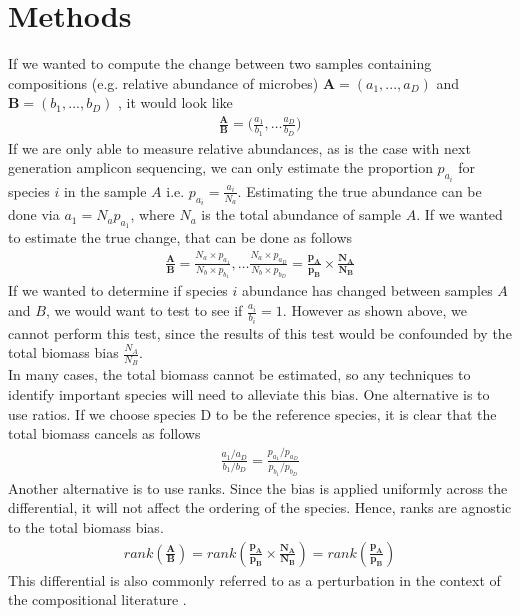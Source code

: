 \section{Methods}
If we wanted to compute the change between two samples containing compositions (e.g. relative abundance of microbes) $\bm A=(a_1,...,a_D)$ and $\bm B=(b_1,...,b_D)$ , it would look like
\begin{align}
  \frac{\bm{A}}{\bm{B}}=\big(\frac{a_1}{b_1} ,\ldots  \frac{a_D}{b_D}\big)
\end{align}
If we are only able to measure relative abundances, as is the case with next generation amplicon sequencing, we can only estimate the proportion $p_{a_i}$ for species $i$ in the sample $A$  i.e. $p_{a_i}=\frac{a_i}{N_a}$.  Estimating the true abundance can be done via $a_1=N_a p_{a_1}$, where $N_a$ is the total abundance of sample $A$.  If we wanted to estimate the true change, that can be done as follows
\begin{align}
  \frac{\bm{A}}{\bm{B}} =
  \frac{N_a \times p_{a_1}}{N_b \times p_{b_1}}, \ldots \frac{N_a \times p_{a_D}}{N_b \times p_{b_D}} =
  \frac{\bm{p_A}}{\bm{p_B}} \times  \frac{\bm{N_A}}{\bm{N_B}}
\end{align}
If we wanted to determine if species $i$ abundance has changed between samples $A$ and $B$, we would want to test to see if $\frac{a_i}{b_i}=1$. However as shown above, we cannot perform this test, since the results of this test would be confounded by the total biomass bias $\frac{N_A}{N_B}$.\\[5 mm]
In many cases, the total biomass cannot be estimated, so any techniques to identify important species will need to alleviate this bias. One alternative is to use ratios. If we choose species D to be the reference species, it is clear that the total biomass cancels as follows
\begin{align}
  \frac{a_1/a_D}{b_1/b_D}  =  \frac{p_{a_1}/p_{a_D} }{p_{b_1}/p_{b_D}}
\end{align}
Another alternative is to use ranks. Since the bias is applied uniformly across the differential, it will not affect the ordering of the species. Hence, ranks are agnostic to the total biomass bias.
\begin{align}
  rank (\frac{\bm{A}}{\bm{B}}) =
  rank(\frac{\bm{p_A}}{\bm{p_B}} \times \frac{\bm{N_A}}{\bm{N_B}}) =
  rank(\frac{\bm{p_A}}{\bm{p_B}} )
\end{align}
This differential is also commonly referred to as a perturbation in the context of the compositional literature \cite{Pawlowsky-Glahn2015-qb}.
